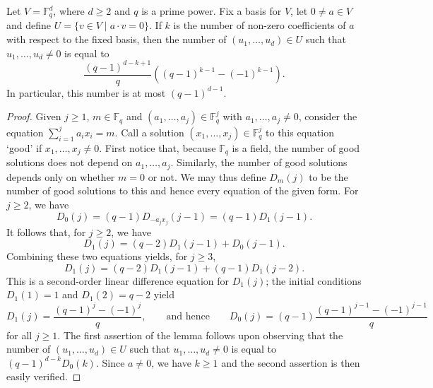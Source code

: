 \documentclass[10pt,a4paper]{amsart}
\begin{document}
\begin{lemma}\label{DerangementsInPGroups1}
Let $V = \mathbb{F}_q^d$, where $d\geq 2$ and $q$ is a prime power. Fix a basis for $V$, let $0\neq a\in V$ and define $U=\{v\in V\mid a\cdot v=0\}$. If $k$ is the number of non-zero coefficients of $a$ with respect to the fixed basis, then the number of $(u_1,\dots,u_d) \in U$ such that $u_1,\dots,u_d \neq 0$ is  equal to
\[\frac{(q-1)^{d-k+1}}{q} \left( (q-1)^{k-1}-(-1)^{k-1} \right).
\] 
In particular, this number is at most $(q-1)^{d-1}$. 
\end{lemma}

\begin{proof}
Given $j\geq 1$, $m\in \mathbb{F}_q$ and $(a_1,\ldots,a_j)\in \mathbb{F}_q^j$ with $a_1,\dots,a_j \neq 0$, consider the equation $\sum_{i=1}^j a_ix_i=m$. Call a solution $(x_1, \dots, x_j) \in \mathbb{F}_q^j$ to this equation `good' if $x_1, \dots, x_j \neq 0$. First notice that, because $\mathbb{F}_q$ is a field, the number of good solutions does not depend on $a_1,\dots,a_j$. Similarly, the number of good solutions depends only on whether $m=0$ or not. We may thus define $D_m(j)$ to be the number of good solutions to this and hence every equation of the given form. For $j\geq 2$, we have 
\[
D_0(j) = (q-1)D_{-a_jx_j}(j-1) = (q-1)D_1(j-1).
\]
It follows that, for $j\geq 2$, we have
\[
D_1(j)  = (q-2)D_1(j-1)+ D_0(j-1). 
\]
Combining these two equations yields, for $j \geq 3$, 
\[
D_1(j) =  (q-2)D_1(j-1)+(q-1)D_1(j-2).
\]
This is a second-order linear difference equation for $D_1(j)$; the initial conditions  $D_1(1)=1$ and  $D_1(2)=q-2$ yield
\[
D_1(j) = \frac{(q-1)^{j}-(-1)^j}{q}, 
\qquad \text{and hence} \qquad
D_0(j) = (q-1)\frac{(q-1)^{j-1}-(-1)^{j-1}}{q}
\]
for all $j\geq 1$. The first assertion of the lemma follows upon observing that the number of  $(u_1,\dots,u_d)\in U$ such that  $u_1,\dots,u_d \neq 0$ is equal to $(q-1)^{d-k}D_0(k)$. Since $a\neq 0$, we have $k\geq 1$ and the second assertion is then easily verified. 
\end{proof}
\end{document}
